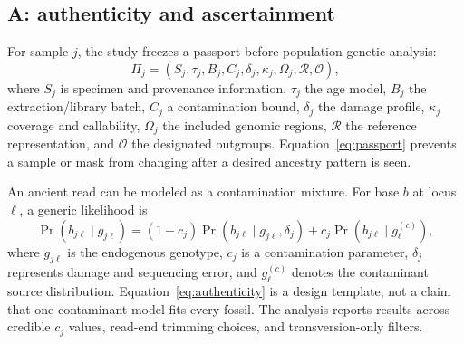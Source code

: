 \documentclass[conference]{IEEEtran}
\begin{document}
\subsection{A: authenticity and ascertainment}

For sample $j$, the study freezes a passport before population-genetic analysis:
\begin{equation}
\label{eq:passport}
\Pi_j=(S_j,\tau_j,B_j,C_j,\delta_j,\kappa_j,\Omega_j,\mathcal{R},\mathcal{O}),
\end{equation}
where $S_j$ is specimen and provenance information, $\tau_j$ the age model, $B_j$ the extraction/library batch, $C_j$ a contamination bound, $\delta_j$ the damage profile, $\kappa_j$ coverage and callability, $\Omega_j$ the included genomic regions, $\mathcal{R}$ the reference representation, and $\mathcal{O}$ the designated outgroups. Equation~\eqref{eq:passport} prevents a sample or mask from changing after a desired ancestry pattern is seen.

An ancient read can be modeled as a contamination mixture. For base $b$ at locus $\ell$, a generic likelihood is
\begin{equation}
\label{eq:authenticity}
\Pr(b_{j\ell}\mid g_{j\ell})=(1-c_j)\Pr(b_{j\ell}\mid g_{j\ell},\delta_j)+c_j\Pr(b_{j\ell}\mid g^{(c)}_{\ell}),
\end{equation}
where $g_{j\ell}$ is the endogenous genotype, $c_j$ is a contamination parameter, $\delta_j$ represents damage and sequencing error, and $g^{(c)}_{\ell}$ denotes the contaminant source distribution. Equation~\eqref{eq:authenticity} is a design template, not a claim that one contaminant model fits every fossil. The analysis reports results across credible $c_j$ values, read-end trimming choices, and transversion-only filters.
\end{document}
